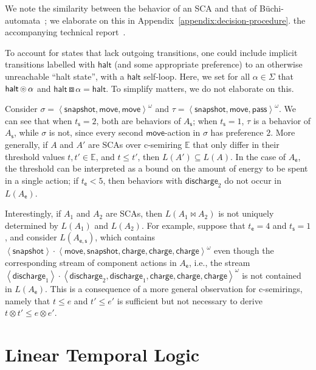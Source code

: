 \documentclass[a4paper]{article}
\newcommand{\buchi}{B\"{u}chi}
\newcommand{\angl}[1]{\left\langle#1\right\rangle}
\newcommand{\abscsemiring}{\mathbb{E}}
\newcommand{\composable}{\mathop{\ocircle}\nolimits}
\newcommand{\compose}{\mathop{\boxbox}\nolimits}
\theoremstyle{definition}
\newcommand{\move}{\mathsf{move}}
\newcommand{\snapshot}{\mathsf{snapshot}}
\newcommand{\halt}{\mathsf{halt}}
\newcommand{\s}{\mathsf{s}}
\newcommand{\discharge}{\mathsf{discharge}}
\newcommand{\charge}{\mathsf{charge}}
\newcommand{\pass}{\mathsf{pass}}
\newcommand{\e}{\mathsf{e}}
\begin{document}
We note the similarity between the behavior of an SCA and that of \buchi-automata~\cite{buchi-1962}; we elaborate on this in 
\iftechreport%
Appendix~\ref{appendix:decision-procedure}.
\else%
the accompanying technical report~\cite{kappe-arbab-talcott-2017-techreport}.
\fi

To account for states that lack outgoing transitions, one could include implicit transitions labelled with $\halt$ (and some appropriate preference) to an otherwise unreachable ``halt state'', with a $\halt$ self-loop. Here, we set for all $\alpha \in \Sigma$ that $\halt \composable \alpha$ and $\halt \compose \alpha = \halt$. To simplify matters, we do not elaborate on this.

Consider $\sigma = \angl{\snapshot, \move, \move}^\omega$ and $\tau  = \angl{\snapshot, \move, \pass}^\omega$. We can see that when $t_\s = 2$, both are behaviors of $A_\s$; when $t_\s = 1$, $\tau$ is a behavior of $A_\s$, while $\sigma$ is not, since every second $\move$-action in $\sigma$ has preference $2$. More generally, if $A$ and $A'$ are SCAs over c-semiring $\abscsemiring$ that only differ in their threshold values $t, t' \in \abscsemiring$, and $t \leq t'$, then $L(A') \subseteq L(A)$. In the case of $A_\e$, the threshold can be interpreted as a bound on the amount of energy to be spent in a single action; if $t_\e < 5$, then behaviors with $\discharge_2$ do not occur in $L(A_\e)$. 

Interestingly, if $A_1$ and $A_2$ are SCAs, then $L(A_1 \bowtie A_2)$ is not uniquely determined by $L(A_1)$ and $L(A_2)$. For example, suppose that $t_\e = 4$ and $t_\s = 1$, and consider $L(A_{\e, \s})$, which contains $\angl{\snapshot} \cdot \angl{\move, \snapshot, \charge, \charge, \charge}^\omega$ even though the corresponding stream of component actions in $A_\e$, i.e., the stream $\angl{\discharge_1} \cdot \angl{\discharge_2, \discharge_1, \charge, \charge, \charge}^\omega$ is not contained in $L(A_\e)$. This is a consequence of a more general observation for c-semirings, namely that $t \leq e$ and $t' \leq e'$ is sufficient but not necessary to derive $t \otimes t' \leq e \otimes e'$.

\section{Linear Temporal Logic}%
\label{section:linear-temporal-logic}
\end{document}
